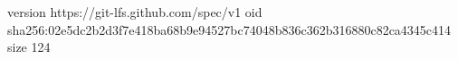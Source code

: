 version https://git-lfs.github.com/spec/v1
oid sha256:02e5dc2b2d3f7e418ba68b9e94527bc74048b836c362b316880c82ca4345c414
size 124
